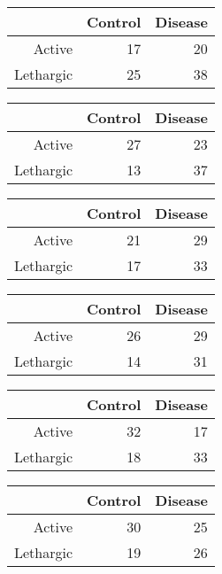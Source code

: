 \documentclass{article}\usepackage{graphicx, color}
\begin{document}
\begin{multicols}{3}
\bigskip
\begin{tabular}{rrr}
  \hline
 & Control & Disease \\ 
  \hline
Active &  17 &  20 \\ 
  Lethargic &  25 &  38 \\ 
   \hline
\end{tabular}


\bigskip
\begin{tabular}{rrr}
  \hline
 & Control & Disease \\ 
  \hline
Active &  27 &  23 \\ 
  Lethargic &  13 &  37 \\ 
   \hline
\end{tabular}


\bigskip
\begin{tabular}{rrr}
  \hline
 & Control & Disease \\ 
  \hline
Active &  21 &  29 \\ 
  Lethargic &  17 &  33 \\ 
   \hline
\end{tabular}


\bigskip
\begin{tabular}{rrr}
  \hline
 & Control & Disease \\ 
  \hline
Active &  26 &  29 \\ 
  Lethargic &  14 &  31 \\ 
   \hline
\end{tabular}


\bigskip
\begin{tabular}{rrr}
  \hline
 & Control & Disease \\ 
  \hline
Active &  32 &  17 \\ 
  Lethargic &  18 &  33 \\ 
   \hline
\end{tabular}


\bigskip
\begin{tabular}{rrr}
  \hline
 & Control & Disease \\ 
  \hline
Active &  30 &  25 \\ 
  Lethargic &  19 &  26 \\ 
   \hline
\end{tabular}



\end{multicols}
\end{document}
